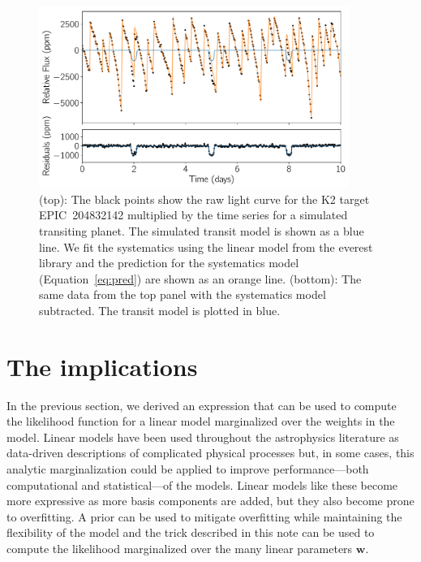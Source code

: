 \documentclass[modern]{rnaastex}
\newcommand{\project}[1]{\textsf{#1}}
\newcommand{\figurelabel}[1]{\label{fig:#1}}
\renewcommand{\eqref}[1]{\ref{eq:#1}}
\newcommand{\eqalt}[1]{Equation~\eqref{#1}}
\newcommand{\bvec}[1]{{\ensuremath{\boldsymbol{#1}}}}
\begin{document}
\begin{figure}[h!]
\begin{center}
\includegraphics[width=0.9\textwidth]{figure.pdf}
\caption{%
(top): The black points show the raw light curve for the \project{K2} target
    EPIC~204832142 multiplied by the time series for a simulated transiting
    planet.
    The simulated transit model is shown as a blue line.
    We fit the systematics using the linear model from the \project{everest}
    library \citep{Luger:2016, Luger:2017} and the prediction for the
    systematics model (\eqalt{pred}) are shown as an orange line.
(bottom): The same data from the top panel with the systematics model
    subtracted.
    The transit model is plotted in blue.
\figurelabel{figure}}
\end{center}
\end{figure}

\section{The implications}

In the previous section, we derived an expression that can be used to compute
the likelihood function for a linear model marginalized over the weights in
the model.
Linear models have been used throughout the astrophysics literature as
data-driven descriptions of complicated physical processes but, in some cases,
this analytic marginalization could be applied to improve performance---both
computational and statistical---of the models.
Linear models like these become more expressive as more basis components are
added, but they also become prone to overfitting.
A prior can be used to mitigate overfitting while maintaining the flexibility
of the model and the trick described in this note can be used to compute the
likelihood marginalized over the many linear parameters $\bvec{w}$.
\end{document}
